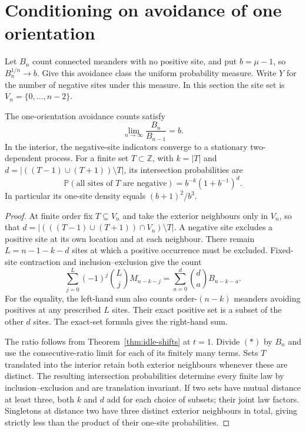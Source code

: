 \section{Conditioning on avoidance of one orientation}

Let \(B_n\) count connected meanders with no positive site, and put
\(b=\mu-1\), so \(B_n^{1/n}\to b\). Give this avoidance class the
uniform probability measure. Write \(Y\) for the number of negative
sites under this measure. In this section the site set is
\(V_n=\{0,\ldots,n-2\}\).

\begin{theorem}\label{thm:conditional-ratio}
The one-orientation avoidance counts satisfy
\[
             \lim_{n\to\infty}\frac{B_n}{B_{n-1}}=b .
\]
In the interior, the negative-site indicators converge to a stationary
two-dependent process. For a finite set \(T\subset\mathbb Z\), with
\(k=|T|\) and \(d=|((T-1)\cup(T+1))\setminus T|\), its intersection
probabilities are
\[
   \mathbb P(\text{all sites of }T\text{ are negative})
             =b^{-k}(1+b^{-1})^d .
\]
In particular its one-site density equals \((b+1)^2/b^3\).
\end{theorem}

\begin{proof}
At finite order fix \(T\subseteq V_n\) and take the exterior neighbours
only in \(V_n\), so that
\(d=|(((T-1)\cup(T+1))\cap V_n)\setminus T|\).
A negative site excludes a positive site at its own location and at
each neighbour. There remain \(L=n-1-k-d\) sites at which a positive
occurrence must be excluded. Fixed-site contraction and
inclusion--exclusion give the count
\[
 \sum_{j=0}^{L}(-1)^j\binom Lj M_{n-k-j}
       =\sum_{a=0}^{d}\binom da B_{n-k-a}.                 \tag{*}
\]
For the equality, the left-hand sum also counts order-\((n-k)\)
meanders avoiding positives at any prescribed \(L\) sites.
Their exact positive set is a subset of the other \(d\) sites.
The exact-set formula gives the right-hand sum.

The ratio follows from Theorem~\ref{thm:idle-shifts} at \(t=1\).
Divide \((*)\) by \(B_n\) and use the consecutive-ratio limit for
each of its finitely many terms. Sets \(T\) translated into the
interior retain both exterior neighbours whenever these are distinct.
The resulting intersection probabilities determine every finite law by
inclusion--exclusion and are translation invariant. If two sets have
mutual distance at least three, both \(k\) and \(d\) add for each choice
of subsets; their joint law factors. Singletons at distance two have
three distinct exterior neighbours in total, giving strictly less than
the product of their one-site probabilities.
\end{proof}

